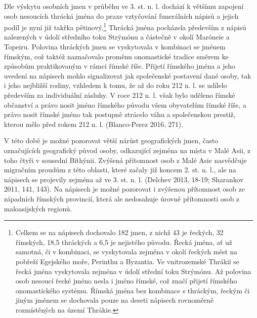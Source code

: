 Dle výskytu osobních jmen v průběhu ve 3. st. n. l. dochází k většímu zapojení osob nesoucích thrácká jména do praxe vztyčování funerálních nápisů a jejich podíl je nyní již takřka pětinový.\footnote{Celkem se na nápisech dochovalo 182 jmen, z nichž 43  je řeckých, 32  římských, 18,5  thráckých a 6,5  je nejistého původu. Řecká jména, ať už samotná, či v kombinaci, se vyskytovala zejména v okolí řeckých měst na pobřeží Egejského moře, Perinthu a Byzantia. Ve vnitrozemské Thrákii se řecká jména vyskytovala zejména v údolí střední toku Strýmónu. Až polovina osob nesoucí řecké jméno nesla i jméno římské, což značí přijetí římského onomastického systému. Římská jména bez kombinace s thráckým, řeckým či jiným jménem se dochovala pouze na deseti nápisech rovnoměrně rozmístěných na území Thrákie.} Thrácká jména pocházela především z nápisů nalezených v údolí středního toku Strýmónu a částečně v okolí Maróneie a Topeiru. Polovina thráckých jmen se vyskytovala v kombinaci se jménem římským, což taktéž naznačovalo proměnu onomastické tradice směrem ke způsobům praktikovaným v rámci římské říše. Přijetí římského jména a jeho uvedení na nápisech mohlo signalizovat jak společenské postavení dané osoby, tak i jeho nejbližší rodiny, vzhledem k tomu, že až do roku 212 n. l. se udílelo především za individuální zásluhy. V roce 212 n. l. však bylo uděleno římské občanství a právo nosit jméno římského původu všem obyvatelům římské říše, a právo nosit římské jméno tak postupně ztrácelo váhu a společenskou prestiž, kterou mělo před rokem 212 n. l. (Blanco-Perez 2016, 271).

V této době je možné pozorovat větší nárůst geografických jmen, často označujících geografický původ osoby, odkazující zejména na místa v Malé Asii, z toho čtyři v sousední Bíthýnii. Zvýšená přítomnost osob z Malé Asie nasvědčuje migračním proudům z této oblasti, které začaly již koncem 2. st. n. l., ale na nápisech se projevily zejména až ve 3. st. n. l. (Delchev 2013, 18-19; Sharankov 2011, 141, 143). Na nápisech je možné pozorovat i zvýšenou přítomnost osob ze západních římských provincií, která ale nedosahuje úrovně přítomnosti osob z maloasijských regionů.

